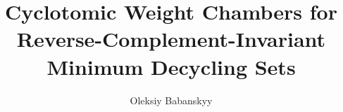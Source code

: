 \documentclass[11pt]{article}
\title{Cyclotomic Weight Chambers for\\
Reverse-Complement-Invariant Minimum Decycling Sets}
\author{Oleksiy Babanskyy}
\date{}
\begin{document}
\maketitle












\appendix




\begingroup
\small


\endgroup
\end{document}
